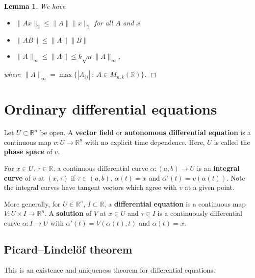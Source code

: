 \documentclass[letter-paper]{tufte-book}
\newtheorem{lemma}[theorem]{\color{pastel-blue}Lemma}
\newcommand{\qedwhite}{\hfill \ensuremath{\Box}}
\begin{document}
\begin{lemma}
  We have
  \begin{itemize}
    \item $\|Ax\|_2 \leq \|A\| \|x\|_2$ for all $A$ and $x$

    \item $\|AB\| \leq \|A\|\|B\|$
    
    \item $\|A\|_\infty \leq \|A\| \leq k\sqrt{n}\|A\|_\infty$,
  \end{itemize}
  where $\|A\|_\infty = \max \{ |A_{ij}|\ : \ A \in M_{n,k}(\mathbb{R})\}$.
  \qedwhite
\end{lemma}


\chapter{Ordinary differential equations}

Let $U \subset \mathbb{R}^n$ be open. A \textbf{vector field} or
\textbf{autonomous differential equation} is a continuous map $v : U \to
\mathbb{R}^n$ with no explicit time dependence. Here, $U$ is called the
\textbf{phase space} of $v$.

For $x \in U$, $\tau \in \mathbb{R}$, a continuous differential curve $\alpha :
(a,b) \to U$ is an \textbf{integral curve} of $v$ at $(x, \tau)$ if $\tau \in
(a,b)$, $\alpha(t) = x$ and $\alpha'(t) = v(\alpha(t))$. Note the integral
curves have tangent vectors which agree with $v$ at a given point.

More generally, for $U \in \mathbb{R}^n$, $I \subset \mathbb{R}$, a
\textbf{differential equation} is a continuous map $V : U\times I \to
\mathbb{R}^n$. A \textbf{solution} of $V$ at $x \in U$ and $\tau \in I$ is a
continuously differential curve $\alpha : I \to U$ with $\alpha'(t) =
V(\alpha(t), t)$ and $\alpha(t) = x$.


\section{Picard--Lindel\"of theorem}

This is an existence and uniqueness theorem for differential equations.
\end{document}
